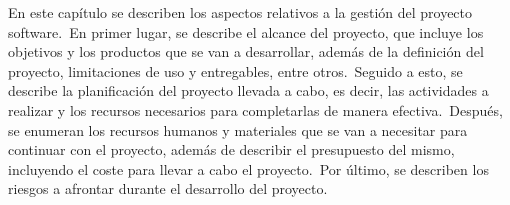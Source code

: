 
En este capítulo se describen los aspectos relativos a la gestión del proyecto software.\ En primer lugar, se
describe el alcance del proyecto, que incluye los objetivos y los productos que se van a desarrollar, además de la
definición del proyecto, limitaciones de uso y entregables, entre otros.\ Seguido a esto, se describe la planificación
del proyecto llevada a cabo, es decir, las actividades a realizar y los recursos necesarios
para completarlas de manera efectiva.\ Después, se enumeran los recursos humanos y materiales que se van a necesitar
para continuar con el proyecto, además de describir el presupuesto del mismo, incluyendo el coste
para llevar a cabo el proyecto.\ Por último, se describen los riesgos a afrontar durante el desarrollo del proyecto.






